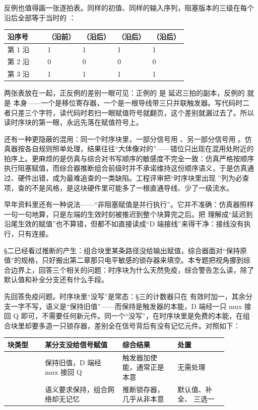 反例也值得画一张逐拍表。同样的初值、同样的输入序列，阻塞版本的三级在每个沿后全部等于当时的 ：

\begin{longtable}{L{0.16\linewidth}L{0.14\linewidth}L{0.14\linewidth}L{0.14\linewidth}L{0.14\linewidth}}
\toprule
沿序号 & （沿前） & （沿后） & （沿后） & （沿后） \\
\midrule
第 1 沿 & 1 & 1 & 1 & 1 \\
第 2 沿 & 0 & 0 & 0 & 0 \\
第 3 沿 & 1 & 1 & 1 & 1 \\
\bottomrule
\end{longtable}

两张表放在一起，正反例的差别一眼可见：正例的  是  延迟三拍的副本，反例的  就是  本身——一个是移位寄存器，一个是一根导线带三只并联触发器。写代码时二者只差三个字符，读代码时若扫一眼赋值符号就翻页，这个差别就漏过去了。所以读时序块的第一眼，永远先落在赋值符号上。

还有一种更隐蔽的混用：同一个时序块里，一部分信号用 \code{<=}、另一部分信号用 \code{=}。仿真器按各自规则照单处理，结果往往“大体像对的”——错位只出现在混用处附近的拍序上。更麻烦的是仿真与综合对书写顺序的敏感度不完全一致：仿真严格按顺序执行阻塞赋值，而综合器推断组合前级时并不承诺维持这份顺序语义，于是仿真通过、硬件出错，成为最难追查的一类缺陷。工程评审把“时序块里出现 \code{=}”列为必查项，查的不是风格，是这块硬件里可能多了一根直通导线、少了一级流水。

早年资料里还有一种说法——“非阻塞赋值是并行执行”。它并不准确：仿真器照样一句一句地算，只是左端的生效时刻被推迟到整个块算完之后。把 \code{<=} 理解成“延迟到沿尾生效的赋值”也不算错，但都不如直接读成“D 端接线”来得干净：接线没有执行，只有连接。


§二已经看过推断的产生：组合块里某条路径没给输出赋值，综合器面对“保持原值”的规格，只好搬出第二章那只电平敏感的锁存器来填空。本专题把视角挪到综合边界上，回答三个相关的问题：时序块为什么天然免疫，综合警告怎么读，除了默认值和补全分支还有什么手段。

先回答免疫问题。时序块里“没写”是常态：§三的计数器只在  有效时加一，其余分支一字不写，语义是“保持旧值”——而保持是触发器的本能，D 端经一只 mux 接回 Q 即可，不需要任何新元件。同一个“没写”，在时序块里是免费的本能，在组合块里却要多造一只锁存器，差别全在信号背后有没有记忆元件。对照如下：

\begin{longtable}{L{0.15\linewidth}L{0.31\linewidth}L{0.22\linewidth}L{0.20\linewidth}}
\toprule
块类型 & 某分支没给信号赋值 & 综合结果 & 处置 \\
\midrule
{} & 保持旧值，D 端经 mux 接回 Q & 触发器加使能，通常正是本意 & 无需处理 \\
 & 语义要求保持，组合网络却无记忆 & 推断锁存器，几乎从非本意 & 默认值、补全、 三选一 \\
\bottomrule
\end{longtable}

